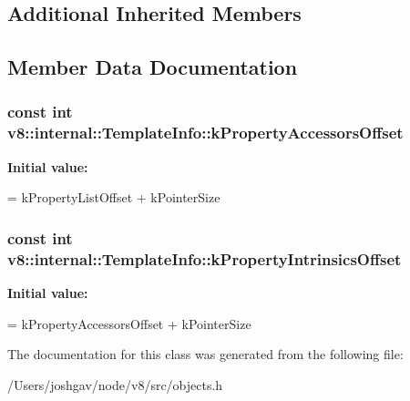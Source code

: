\subsection*{Additional Inherited Members}


\subsection{Member Data Documentation}
\subsubsection[{\texorpdfstring{k\+Property\+Accessors\+Offset}{kPropertyAccessorsOffset}}]{\setlength{\rightskip}{0pt plus 5cm}const int v8\+::internal\+::\+Template\+Info\+::k\+Property\+Accessors\+Offset\hspace{0.3cm}{\ttfamily [static]}}\hypertarget{classv8_1_1internal_1_1_template_info_adb44b9970edc23fa6c622248af66db6f}{}\label{classv8_1_1internal_1_1_template_info_adb44b9970edc23fa6c622248af66db6f}
{\bfseries Initial value\+:}
\begin{DoxyCode}
=
      kPropertyListOffset + kPointerSize
\end{DoxyCode}
\subsubsection[{\texorpdfstring{k\+Property\+Intrinsics\+Offset}{kPropertyIntrinsicsOffset}}]{\setlength{\rightskip}{0pt plus 5cm}const int v8\+::internal\+::\+Template\+Info\+::k\+Property\+Intrinsics\+Offset\hspace{0.3cm}{\ttfamily [static]}}\hypertarget{classv8_1_1internal_1_1_template_info_a0c19f8da5b7208ec7075b1b50dcadb33}{}\label{classv8_1_1internal_1_1_template_info_a0c19f8da5b7208ec7075b1b50dcadb33}
{\bfseries Initial value\+:}
\begin{DoxyCode}
=
      kPropertyAccessorsOffset + kPointerSize
\end{DoxyCode}


The documentation for this class was generated from the following file\+:\begin{DoxyCompactItemize}
\item 
/\+Users/joshgav/node/v8/src/objects.\+h\end{DoxyCompactItemize}
